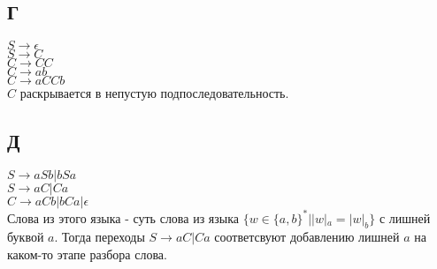 \documentclass{article}
\begin{document}
    \subsection{Г}
    $ S \to \epsilon$\\
    $ S \to C$\\
    $ C \to CC $\\
    $ C \to ab $\\
    $ C \to aCCb $\\
    $C$ раскрывается в непустую подпоследовательность.
    \subsection{Д}
    $ S \to aSb | bSa $ \\
    $ S \to aC|Ca $ \\
    $ C \to aCb|bCa|\epsilon$\\
    Слова из этого языка - суть слова из языка $\{ w \in \{a, b\}^* | |w|_a = |w|_b \} $ с лишней буквой $a$. 
    Тогда переходы $ S \to aC|Ca $ соответсвуют добавлению лишней $a$ на каком-то этапе разбора слова.
\end{document}
